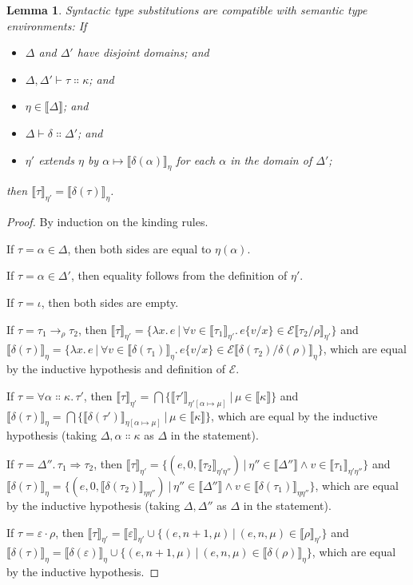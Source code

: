 \documentclass[a4paper, 11pt,titlepage, openright, twoside]{report}
\newcommand{\subst}[2]{\{#1/#2\}}
\newcommand{\E}{\mathcal{E}}
\newcommand{\+}{\enspace}
\newtheorem{lemma}{Lemma}
\begin{document}
\begin{lemma} \label{subst-comp}
	Syntactic type substitutions are compatible with semantic type environments: If
	\begin{itemize}
	\item $Δ$ and $Δ'$ have disjoint domains; and
	\item $Δ,Δ' ⊢ τ ∷ κ$; and
	\item $η∈⟦Δ⟧$; and
	\item $Δ ⊢ δ ∷ Δ'$; and
	\item $η'$ extends $η$ by $α↦⟦δ(α)⟧_η$ for each $α$ in the domain of $Δ'$;
	\end{itemize}
	then $⟦τ⟧_{η'} = ⟦δ(τ)⟧_η$.
\end{lemma}
\begin{proof}
	By induction on the kinding rules.

	If $τ=α ∈ Δ$, then both sides are equal to $η(α)$.

	If $τ=α ∈ Δ'$, then equality follows from the definition of $η'$.

	If $τ=ι$, then both sides are empty.

	If $τ=τ_1 →_ρ τ_2$, then
	$⟦τ⟧_{η'} = \{λx.\,e │ ∀v ∈ ⟦τ_1⟧_{η'}.\,e\subst{v}{x} ∈ \E⟦τ_2/ρ⟧_{η'}\}$
	and
	$⟦δ(τ)⟧_η = \{λx.\,e │ ∀v ∈ ⟦δ(τ_1)⟧_η.\,e\subst{v}{x} ∈ \E⟦δ(τ_2)/δ(ρ)⟧_η\}$,
	which are equal by the inductive hypothesis and definition of $\E$.

	If $τ=∀α∷κ.\,τ'$, then
	$⟦τ⟧_{η'} = \bigcap \{⟦τ'⟧_{η'[α↦μ]} │ μ∈⟦κ⟧\}$
	and
	$⟦δ(τ)⟧_{η} = \bigcap \{⟦δ(τ')⟧_{η[α↦μ]} │ μ∈⟦κ⟧\}$,
	which are equal by the inductive hypothesis
	(taking $Δ, α∷κ$ as $Δ$ in the statement).

	If $τ=Δ''.\,τ_1 \Rightarrow τ_2$,
	then $⟦τ⟧_{η'} = \{(e,0,⟦τ_2⟧_{η'η''}) │ η'' ∈ ⟦Δ''⟧ ∧ v ∈ ⟦τ_1⟧_{η'η''} \}$
	and $⟦δ(τ)⟧_{η} = \{(e,0,⟦δ(τ_2)⟧_{ηη''}) │ η'' ∈ ⟦Δ''⟧ ∧ v ∈ ⟦δ(τ_1)⟧_{ηη''} \}$,
	which are equal by the inductive hypothesis (taking $Δ, Δ''$ as $Δ$ in the statement).

	If $τ=ε·ρ$,
	then $⟦τ⟧_{η'} = ⟦ε⟧_{η'} ∪ \{(e,n+1,μ) │ (e,n,μ) ∈ ⟦ρ⟧_{η'} \}$
	and $⟦δ(τ)⟧_{η} = ⟦δ(ε)⟧_{η} ∪ \{(e,n+1,μ) │ (e,n,μ) ∈ ⟦δ(ρ)⟧_{η} \}$,
	which are equal by the inductive hypothesis.
\end{proof}
\end{document}
